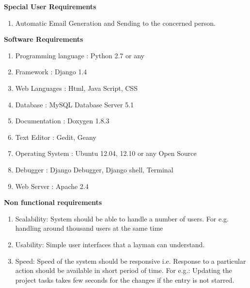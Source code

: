 \vskip 0.5cm
{\bf Special User Requirements}
\begin{enumerate} 
\item Automatic Email Generation and Sending to the concerned person.
\end{enumerate}
\vskip 0.5cm
{\bf Software Requirements}
\begin{enumerate} 
\item Programming language : Python 2.7 or any
\item Framework : Django 1.4 
\item Web Languages : Html, Java Script, CSS 
\item Database : MySQL Database Server 5.1 
\item Documentation : Doxygen 1.8.3
\item Text Editor : Gedit, Geany
\item Operating System : Ubuntu 12.04, 12.10 or any Open Source
\item Debugger : Django Debugger, Django shell, Terminal
\item Web Server : Apache 2.4
\end{enumerate}
\vskip 0.5cm
{\bf Non functional requirements}
\begin{enumerate} 
\item Scalability: System should be able to handle a number of users. For e.g. handling around thousand users at the same time
\item Usability: Simple user interfaces that a layman can understand.
\item Speed: Speed of the system should be responsive i.e. Response to a particular action should be available in short period of time. For e.g.: Updating the project tasks takes few seconds for the changes if the entry is not starred.
\end{enumerate}
\newpage

